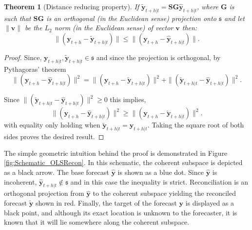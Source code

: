 \documentclass[12pt]{article}
\newtheorem{theo}{Theorem}[section]
\theoremstyle{definition}
\begin{document}
	
	\begin{theo}[Distance reducing property]\label{th:distred}
		If $\tilde{\bm{y}}_{t+h|t}=\bm{S}\bm{G}\hat{\bm{y}}_{t+h|t}$, where $\bm{G}$ is such that $\bm{S}\bm{G}$ is an orthogonal (in the Euclidean sense) projection onto $\mathfrak{s}$ and let $\|\bm{v}\|$ be the $L_2$ norm (in the Euclidean sense) of vector $\bm{v}$ then:
		\begin{equation*}
		\|(\bm{y}_{t+h}-\tilde{\bm{y}}_{t+h|t})\|\le\|(\bm{y}_{t+h}-\hat{\bm{y}}_{t+h|t})\|.
		\end{equation*}
	\end{theo}
	\begin{proof}
		Since, $\bm{y}_{t+h|t},\tilde{\bm{y}}_{t+h|t}\in\mathfrak{s}$ and since the projection is orthogonal, by Pythagoras' theorem
		\begin{equation*} \|(\bm{y}_{t+h}-\hat{\bm{y}}_{t+h|t})\|^2=\|(\bm{y}_{t+h}-\tilde{\bm{y}}_{t+h|t})\|^2+\|(\tilde{\bm{y}}_{t+h|t}-\hat{\bm{y}}_{t+h|t})\|^2.
		\end{equation*}
		
		Since $\|(\tilde{\bm{y}}_{t+h|t}-\hat{\bm{y}}_{t+h|t})\|^2\ge 0$ this implies,
		\begin{equation*} \|(\bm{y}_{t+h}-\hat{\bm{y}}_{t+h|t})\|^2\ge\|(\bm{y}_{t+h}-\tilde{\bm{y}}_{t+h|t})\|^2.
		\end{equation*}
		with equality only holding when $\tilde{\bm{y}}_{t+h|t}=\hat{\bm{y}}_{t+h|t}$.  Taking the square root of both sides proves the desired result.
	\end{proof}
		
	The simple geometric intuition behind the proof is demonstrated in Figure \ref{fig:Schematic_OLSRecon}.  In this schematic, the coherent subspace is depicted as a black arrow.  The base forecast $\hat{\bm{y}}$ is shown as a blue dot.  Since $\hat{\bm{y}}$ is incoherent, $\hat{\bm{y}}_{t+h|t}\notin\mathfrak{s}$ and in this case the inequality is strict.  Reconciliation is an orthogonal projection from $\hat{\bm{y}}$ to the coherent subspace yielding the reconciled forecast $\tilde{\bm{y}}$ shown in red.  Finally, the target of the forecast $\bm{y}$ is displayed as a black point, and although its exact location is unknown to the forecaster, it is known that it will lie somewhere along the coherent subspace.
	
\end{document}
